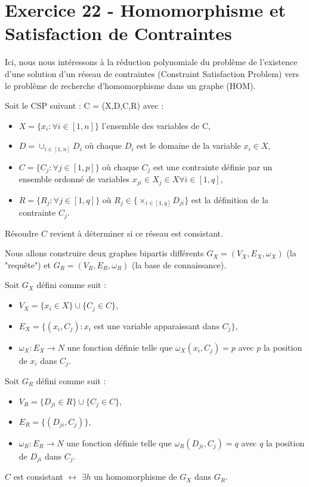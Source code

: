 
\section{Exercice 22 - Homomorphisme et Satisfaction de Contraintes}\label{ex22}
Ici, nous nous int\'eressons \`a la r\'eduction polynomiale du probl\`eme de l'existence
d'une solution d'un r\'eseau de contraintes (Constraint Satisfaction Problem)
vers le probl\`eme de recherche d'homomorphisme dans un graphe (HOM).

Soit le CSP suivant : C = (X,D,C,R) avec :
\spacelist
\begin{itemize}
	\item $X = \{x_i : \forall i \in [1,n]\}$ l'ensemble des variables de C,
	\item $D = \cup_{i \in [1,n]}D_i$ o\`u chaque $D_i$ est le domaine de la variable
	$x_i \in X$,
	\item $C = \{C_j : \forall j \in [1,p]\}$ o\`u chaque $C_j$ est une contrainte
	d\'efinie par un ensemble ordonn\'e de variables $x_{ji} \in X_j \in X \forall i \in
	[1,q]$,
	\item $R = \{R_j : \forall j \in [1,q]\}$ o\`u $R_j \in \{\times_{i \in [1,q]}D_{ji}\}$ est
	la d\'efinition de la contrainte $C_j$.\\
\end{itemize}
R\'esoudre $C$ revient \`a d\'eterminer si ce r\'eseau est consistant.

Nous allons construire deux graphes bipartis diff\'erents $G_{X} = (V_X,E_X,\omega_X)$ (la
"requ\^ete") et $G_R = (V_R,E_R,\omega_R)$ (la base de connaissance).

Soit $G_X$ d\'efini comme suit :
\spacelist
\begin{itemize}
	\item $V_X = \{x_i \in X\} \cup \{C_j \in C\}$,
	\item $E_X = \{(x_i,C_j) : x_i$ est une variable apparaissant dans $C_j \}$,
	\item $\omega_X : E_X \rightarrow N$ une fonction d\'efinie telle que
	$\omega_X(x_i,C_j) = p$ avec $p$ la position de $x_i$ dans $C_j$.\\
\end{itemize}

Soit $G_R$ d\'efini comme suit :
\spacelist
\begin{itemize}
	\item $V_R = \{D_{ji} \in R\} \cup \{C_j \in C\}$,
	\item $E_R = \{(D_{ji},C_j)\}$,
	\item $\omega_R : E_R \rightarrow N$ une fonction d\'efinie telle que
	$\omega_R(D_{ji},C_j) = q$ avec $q$ la position de $D_{ji}$ dans $C_j$.\\
\end{itemize}

$C$ est consistant $\leftrightarrow$ $\exists h$ un homomorphisme de $G_X$ dans $G_R$.


